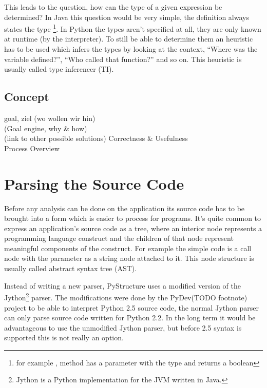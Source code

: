 \documentclass[12pt,halfparskip]{scrreprt}
\begin{document}
This leads to the question, how can the type of a given expression be determined? In Java this question would be very simple, the definition always states the type \footnote{for example , method  has a parameter  with the type  and returns a boolean}. In Python the types aren't specified at all, they are only known at runtime (by the interpreter). To still be able to determine them an heuristic has to be used which infers the types by looking at the context, ``Where was the variable defined?'', ``Who called that function?'' and so on. This heuristic is usually called type inferencer (TI).


\subsection{Concept}

goal, ziel (wo wollen wir hin)\\
(Goal engine, why \& how) \\
(link to other possible solutions)
Correctness \& Usefulness \\
Process Overview \\

\section{Parsing the Source Code}

Before any analysis can be done on the application its source code has to be brought into a form which is easier to process for programs. It's quite common to express an application's source code as a tree, where an interior node represents a programming language construct and the children of that node represent meaningful components of the construct. For example the simple code  is a call node with the parameter as a string node attached to it. This node structure is usually called abstract syntax tree (AST).

Instead of writing a new parser, PyStructure uses a modified version of the Jython\footnote{Jython is a Python implementation for the JVM written in Java.} parser. The modifications were done by the PyDev(TODO footnote) project to be able to interpret Python 2.5 source code, the normal Jython parser can only parse source code written for Python 2.2. In the long term it would be advantageous to use the unmodified Jython parser, but before 2.5 syntax is supported this is not really an option.
\end{document}
